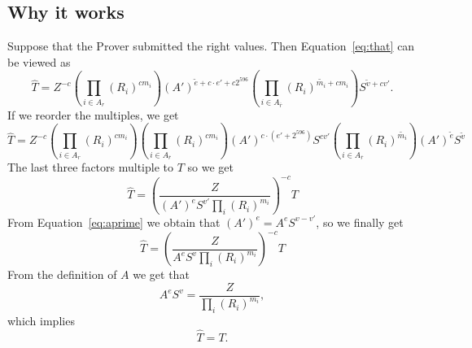 \documentclass[a4paper]{article}
\begin{document}
\subsection{Why it works}

Suppose that the Prover submitted the right values. Then Equation~\eqref{eq:that} can be viewed as
\begin{equation}
\widehat{T} = Z^{-c}\left(\prod_{i \in A_r}(R_i)^{cm_i}\right)
(A')^{ \widetilde{e}+c\cdot e'+c2^{596}} \left(\prod_{i\in A_{\overline{r}}}(R_i)^{ \widetilde{m_i} + cm_i}\right)
S^{\widetilde{v}+cv'}.
\end{equation}
If we reorder the multiples, we get
\begin{equation}
\widehat{T} = Z^{-c}\left(\prod_{i \in A_r}(R_i)^{cm_i}\right)\left(\prod_{i\in A_{\overline{r}}}(R_i)^{ cm_i}\right)
(A')^{ c\cdot (e'+2^{596})}
S^{cv'}
\left(\prod_{i\in A_{\overline{r}}}(R_i)^{ \widetilde{m_i}}\right)(A')^{ \widetilde{e}}
S^{\widetilde{v}}
\end{equation}
The last three factors multiple to $T$ so we get
\begin{equation}
\widehat{T} =\left(\frac{Z}{(A')^{e}S^{v'}\prod_i (R_i)^{m_i}}\right)^{-c}T
\end{equation}
From Equation~\eqref{eq:aprime} we obtain that
$(A')^e =A^e S^{v-v'}$, so we finally get
\begin{equation}
\widehat{T} =\left(\frac{Z}{A^{e}S^{v}\prod_i (R_i)^{m_i}}\right)^{-c}T
\end{equation} 
From the definition of $A$ we get that
\begin{equation}
A^e S^v = \frac{Z}{\prod_i (R_i)^{m_i}},
\end{equation}
which implies
$$
\widehat{T} = T.
$$
\end{document}
